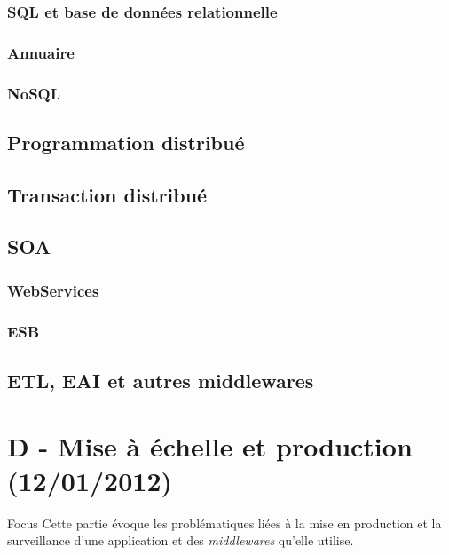 \subsubsection{SQL et base de données relationnelle}
\subsubsection{Annuaire}
\subsubsection{NoSQL}
\subsection{Programmation distribué}
\subsection{Transaction distribué}
\subsection{SOA}
\subsubsection{WebServices}

\subsubsection{ESB}
\subsection{ETL, EAI et autres middlewares}

\section{D - Mise à échelle et production (12/01/2012)}
\begin{frame}
  \begin{block}{Focus}
    Cette partie évoque les problématiques liées à la mise en production 
    et la surveillance d'une application et des \textit{middlewares} qu'elle utilise.
  \end{block}
\end{frame}
